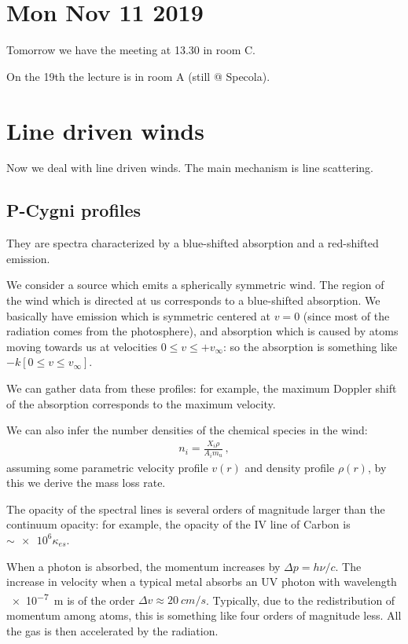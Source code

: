\documentclass[main.tex]{subfiles}
\begin{document}
\section*{Mon Nov 11 2019}

Tomorrow we have the meeting at 13.30 in room C.

On the 19th the lecture is in room A (still @ Specola).

\section{Line driven winds}

Now we deal with line driven winds.
The main mechanism is line scattering.

\subsection{P-Cygni profiles}

They are spectra characterized  by a blue-shifted absorption and a red-shifted emission.

We consider a source which emits a spherically symmetric wind.
The region of the wind which is directed at us corresponds to a blue-shifted absorption.
We basically have emission which is symmetric centered at \(v=0\) (since most of the radiation comes from the photosphere), and absorption which is caused by atoms moving towards us at velocities \(0 \leq v \leq + v_\infty\): so the absorption is something like \(- k [0 \leq v \leq v_\infty]\).

We can gather data from these profiles: for example, the maximum Doppler shift of the absorption corresponds to the maximum velocity.

We can also infer the number densities of the chemical species in the wind: 
%
\begin{align}
  n_i  = \frac{X_i \rho }{A_i m_u}
\,,
\end{align}
%
assuming some parametric velocity profile \(v(r)\) and density profile \(\rho (r)\), by this we derive the mass loss rate.

The opacity of the spectral lines is several orders of magnitude larger than the continuum opacity: for example, the opacity of the IV line of Carbon is \(\sim \num{e6} \kappa_{es}\).

When a photon is absorbed, the momentum increases by \(\Delta p = h \nu / c \). 
The increase in velocity when a typical metal absorbs an UV photon with wavelength \SI{e-7}{m} is of the order \(\Delta v \approx \SI{20}{cm/s}\). Typically, due to the redistribution of momentum among atoms, this is something like four orders of magnitude less.
All the gas is then accelerated by the radiation.
\end{document}
